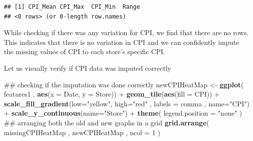 \documentclass[]{article}
\newenvironment{Shaded}{\begin{snugshade}}{\end{snugshade}}
\newcommand{\KeywordTok}[1]{\textcolor[rgb]{0.13,0.29,0.53}{\textbf{{#1}}}}
\newcommand{\DataTypeTok}[1]{\textcolor[rgb]{0.13,0.29,0.53}{{#1}}}
\newcommand{\DecValTok}[1]{\textcolor[rgb]{0.00,0.00,0.81}{{#1}}}
\newcommand{\StringTok}[1]{\textcolor[rgb]{0.31,0.60,0.02}{{#1}}}
\newcommand{\OtherTok}[1]{\textcolor[rgb]{0.56,0.35,0.01}{{#1}}}
\newcommand{\NormalTok}[1]{{#1}}
\begin{document}
\begin{verbatim}
## [1] CPI_Mean CPI_Max  CPI_Min  Range   
## <0 rows> (or 0-length row.names)
\end{verbatim}

While checking if there was any variation for CPI, we find that there
are no rows. This indicates that there is no variation in CPI and we can
confidently impute the missing values of CPI to each store's specific
CPI.

\begin{Shaded}
\end{Shaded}

Let us visually verify if CPI data was imputed correctly

\begin{Shaded}
\begin{Highlighting}[]
\NormalTok{## checking if the imputation was done correctly}
\NormalTok{newCPIHeatMap <-}\StringTok{ }\KeywordTok{ggplot}\NormalTok{( features1 , }\KeywordTok{aes}\NormalTok{(}\DataTypeTok{x =} \NormalTok{Date, }\DataTypeTok{y =} \NormalTok{Store)) +}\StringTok{ }
\StringTok{  }\KeywordTok{geom_tile}\NormalTok{(}\KeywordTok{aes}\NormalTok{(}\DataTypeTok{fill =} \NormalTok{CPI)) +}
\StringTok{  }\KeywordTok{scale_fill_gradient}\NormalTok{(}\DataTypeTok{low=}\StringTok{"yellow"}\NormalTok{, }\DataTypeTok{high=}\StringTok{"red"} \NormalTok{, }\DataTypeTok{labels =} \NormalTok{comma , }\DataTypeTok{name=}\StringTok{"CPI"}\NormalTok{) +}
\StringTok{  }\KeywordTok{scale_y_continuous}\NormalTok{(}\DataTypeTok{name=}\StringTok{"Store"}\NormalTok{) +}
\StringTok{  }\KeywordTok{theme}\NormalTok{( }\DataTypeTok{legend.position =} \StringTok{"none"} \NormalTok{)}
\NormalTok{## arranging both the old and new graphs in a grid}
\KeywordTok{grid.arrange}\NormalTok{( missingCPIHeatMap , newCPIHeatMap , }\DataTypeTok{ncol =} \DecValTok{1} \NormalTok{)}
\end{Highlighting}
\end{Shaded}
\end{document}
